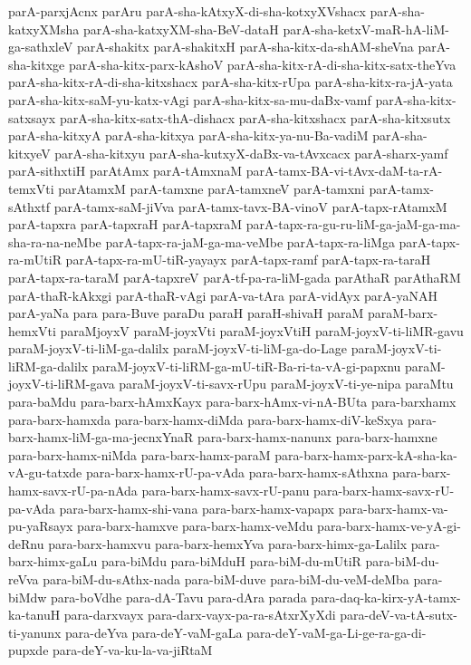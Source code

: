 {parA-parxjAcnx
parAru
parA-sha-kAtxyX-di-sha-kotxyXVshacx
parA-sha-katxyXMsha
parA-sha-katxyXM-sha-BeV-dataH
parA-sha-ketxV-maR-hA-liM-ga-sathxleV
parA-shakitx
parA-shakitxH
parA-sha-kitx-da-shAM-sheVna
parA-sha-kitxge
parA-sha-kitx-parx-kAshoV
parA-sha-kitx-rA-di-sha-kitx-satx-theYva
parA-sha-kitx-rA-di-sha-kitxshacx
parA-sha-kitx-rUpa
parA-sha-kitx-ra-jA-yata
parA-sha-kitx-saM-yu-katx-vAgi
parA-sha-kitx-sa-mu-daBx-vamf
parA-sha-kitx-satxsayx
parA-sha-kitx-satx-thA-dishacx
parA-sha-kitxshacx
parA-sha-kitxsutx
parA-sha-kitxyA
parA-sha-kitxya
parA-sha-kitx-ya-nu-Ba-vadiM
parA-sha-kitxyeV
parA-sha-kitxyu
parA-sha-kutxyX-daBx-va-tAvxcacx
parA-sharx-yamf
parA-sithxtiH
parAtAmx
parA-tAmxnaM
parA-tamx-BA-vi-tAvx-daM-ta-rA-temxVti
parAtamxM
parA-tamxne
parA-tamxneV
parA-tamxni
parA-tamx-sAthxtf
parA-tamx-saM-jiVva
parA-tamx-tavx-BA-vinoV
parA-tapx-rAtamxM
parA-tapxra
parA-tapxraH
parA-tapxraM
parA-tapx-ra-gu-ru-liM-ga-jaM-ga-ma-sha-ra-na-neMbe
parA-tapx-ra-jaM-ga-ma-veMbe
parA-tapx-ra-liMga
parA-tapx-ra-mUtiR
parA-tapx-ra-mU-tiR-yayayx
parA-tapx-ramf
parA-tapx-ra-taraH
parA-tapx-ra-taraM
parA-tapxreV
parA-tf-pa-ra-liM-gada
parAthaR
parAthaRM
parA-thaR-kAkxgi
parA-thaR-vAgi
parA-va-tAra
parA-vidAyx
parA-yaNAH
parA-yaNa
para
para-Buve
paraDu
paraH
paraH-shivaH
paraM
paraM-barx-hemxVti
paraMjoyxV
paraM-joyxVti
paraM-joyxVtiH
paraM-joyxV-ti-liMR-gavu
paraM-joyxV-ti-liM-ga-dalilx
paraM-joyxV-ti-liM-ga-do-Lage
paraM-joyxV-ti-liRM-ga-dalilx
paraM-joyxV-ti-liRM-ga-mU-tiR-Ba-ri-ta-vA-gi-papxnu
paraM-joyxV-ti-liRM-gava
paraM-joyxV-ti-savx-rUpu
paraM-joyxV-ti-ye-nipa
paraMtu
para-baMdu
para-barx-hAmxKayx
para-barx-hAmx-vi-nA-BUta
para-barxhamx
para-barx-hamxda
para-barx-hamx-diMda
para-barx-hamx-diV-keSxya
para-barx-hamx-liM-ga-ma-jecnxYnaR
para-barx-hamx-nanunx
para-barx-hamxne
para-barx-hamx-niMda
para-barx-hamx-paraM
para-barx-hamx-parx-kA-sha-ka-vA-gu-tatxde
para-barx-hamx-rU-pa-vAda
para-barx-hamx-sAthxna
para-barx-hamx-savx-rU-pa-nAda
para-barx-hamx-savx-rU-panu
para-barx-hamx-savx-rU-pa-vAda
para-barx-hamx-shi-vana
para-barx-hamx-vapapx
para-barx-hamx-va-pu-yaRsayx
para-barx-hamxve
para-barx-hamx-veMdu
para-barx-hamx-ve-yA-gi-deRnu
para-barx-hamxvu
para-barx-hemxYva
para-barx-himx-ga-Lalilx
para-barx-himx-gaLu
para-biMdu
para-biMduH
para-biM-du-mUtiR
para-biM-du-reVva
para-biM-du-sAthx-nada
para-biM-duve
para-biM-du-veM-deMba
para-biMdw
para-boVdhe
para-dA-Tavu
para-dAra
parada
para-daq-ka-kirx-yA-tamx-ka-tanuH
para-darxvayx
para-darx-vayx-pa-ra-sAtxrXyXdi
para-deV-va-tA-sutx-ti-yanunx
para-deYva
para-deY-vaM-gaLa
para-deY-vaM-ga-Li-ge-ra-ga-di-pupxde
para-deY-va-ku-la-va-jiRtaM
}
